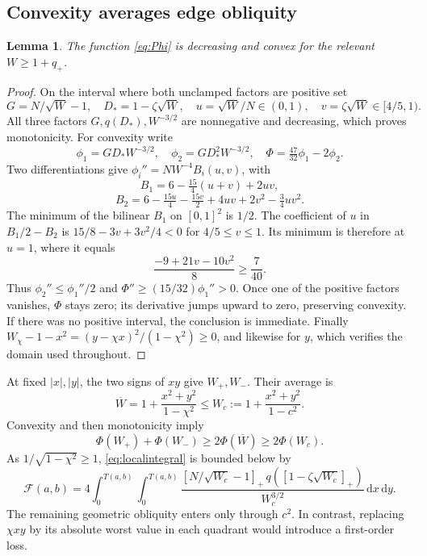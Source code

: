 \documentclass[11pt]{article}
\numberwithin{equation}{section}
\newtheorem{lemma}[theorem]{Lemma}
\theoremstyle{definition}\newtheorem{definition}[theorem]{Definition}
\theoremstyle{remark}\newtheorem{remark}[theorem]{Remark}
\newcommand{\dd}{\,\mathrm d}
\newcommand{\pp}[1]{[#1]_+}
\begin{document}
\subsection{Convexity averages edge obliquity}\label{sec:convexity}
\begin{lemma}\label{lem:Phi}
The function \cref{eq:Phi} is decreasing and convex for the relevant
$W\ge1+q_+$.
\end{lemma}
\begin{proof}
On the interval where both unclamped factors are positive set
\[
 G=N/\sqrt W-1,\quad D_*=1-\zeta\sqrt W,\quad
 u=\sqrt W/N\in(0,1),\quad v=\zeta\sqrt W\in[4/5,1).
\]
All three factors $G,q(D_*),W^{-3/2}$ are nonnegative and decreasing, which
proves monotonicity. For convexity write
\[
 \phi_1=GD_*W^{-3/2},\quad\phi_2=GD_*^2W^{-3/2},\quad
 \Phi=\tfrac{47}{32}\phi_1-2\phi_2.
\]
Two differentiations give $\phi_i''=NW^{-4}B_i(u,v)$, with
\[
 B_1=6-\tfrac{15}{4}(u+v)+2uv,
\]
\[
 B_2=6-\tfrac{15u}{4}-\tfrac{15v}{2}+4uv+2v^2-\tfrac34uv^2.
\]
The minimum of the bilinear $B_1$ on $[0,1]^2$ is $1/2$. The coefficient
of $u$ in $B_1/2-B_2$ is
$15/8-3v+3v^2/4<0$ for $4/5\le v\le1$. Its minimum is therefore at
$u=1$, where it equals
\[
 \frac{-9+21v-10v^2}{8}\ge\frac7{40}.
\]
Thus $\phi_2''\le\phi_1''/2$ and
$\Phi''\ge(15/32)\phi_1''>0$. Once one of the positive factors vanishes,
$\Phi$ stays zero; its derivative jumps upward to zero, preserving convexity.
If there was no positive interval, the conclusion is immediate.
Finally
$W_\chi-1-x^2=(y-\chi x)^2/(1-\chi^2)\ge0$, and likewise for $y$,
which verifies the domain used throughout.
\end{proof}

At fixed $|x|,|y|$, the two signs of $xy$ give $W_+,W_-$. Their average is
\[
 \overline W=1+\frac{x^2+y^2}{1-\chi^2}
 \le W_c:=1+\frac{x^2+y^2}{1-c^2}.
\]
Convexity and then monotonicity imply
\begin{equation}\label{eq:Jensen}
 \Phi(W_+)+\Phi(W_-)\ge2\Phi(\overline W)\ge2\Phi(W_c).
\end{equation}
As $1/\sqrt{1-\chi^2}\ge1$, \cref{eq:localintegral} is bounded below by
\begin{equation}\label{eq:F}
 \boxed{\mathcal F(a,b)=4\int_0^{T(a,b)}\int_0^{T(a,b)}
  \frac{\pp{N/\sqrt{W_c}-1}\,
       q(\pp{1-\zeta\sqrt{W_c}})}{W_c^{3/2}}\dd x\dd y.}
\end{equation}
The remaining geometric obliquity enters only through $c^2$. In contrast,
replacing $\chi xy$ by its absolute worst value in each quadrant would
introduce a first-order loss.
\end{document}
